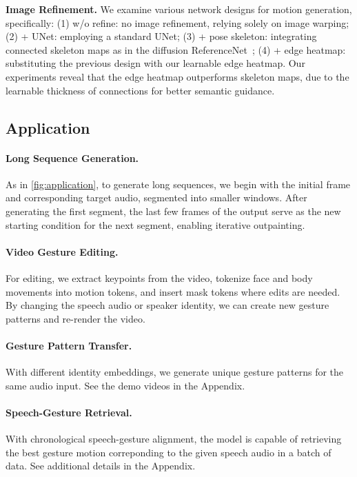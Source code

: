 \noindent \textbf{Image Refinement.}  
We examine various network designs for motion generation, specifically: (1) w/o refine: no image refinement, relying solely on image warping; (2) + UNet: employing a standard UNet; (3) + pose skeleton: integrating connected skeleton maps as in the diffusion ReferenceNet~\cite{hu2023animateanyone}; (4) + edge heatmap: substituting the previous design with our learnable edge heatmap. Our experiments reveal that the edge heatmap outperforms skeleton maps, due to the learnable thickness of connections for better semantic guidance.



\vspace{-0.2cm} 
\subsection{Application}

\paragraph{Long Sequence Generation.} As in \cref{fig:application}, to generate long sequences, we begin with the initial frame and corresponding target audio, segmented into smaller windows. After generating the first segment, the last few frames of the output serve as the new starting condition for the next segment, enabling iterative outpainting.

\vspace{-0.2cm} 
\paragraph{Video Gesture Editing.} For editing, we extract keypoints from the video, tokenize face and body movements into motion tokens, and insert mask tokens where edits are needed. By changing the speech audio or speaker identity, we can create new gesture patterns and re-render the video.

\vspace{-0.2cm} 
\paragraph{Gesture Pattern Transfer.} With different identity embeddings, we generate unique gesture patterns for the same audio input. See the demo videos in the Appendix.

\vspace{-0.2cm} 
\paragraph{Speech-Gesture Retrieval.} With chronological speech-gesture alignment, the model is capable of retrieving the best gesture motion correponding to the given speech audio in a batch of data. See additional details in the Appendix.
